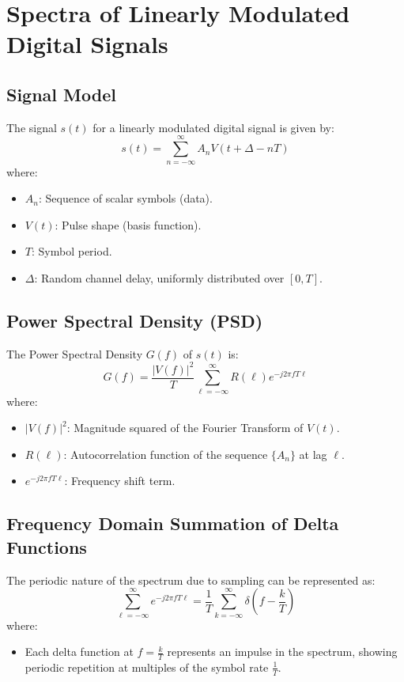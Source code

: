 \documentclass[10pt]{article}
\begin{document}
\section{Spectra of Linearly Modulated Digital Signals}

\subsection{Signal Model}
The signal \( s(t) \) for a linearly modulated digital signal is given by:
\[
s(t) = \sum_{n=-\infty}^{\infty} A_n V(t + \Delta - nT)
\]
where:
\begin{itemize}
    \item \( A_n \): Sequence of scalar symbols (data).
    \item \( V(t) \): Pulse shape (basis function).
    \item \( T \): Symbol period.
    \item \( \Delta \): Random channel delay, uniformly distributed over \( [0, T] \).
\end{itemize}

\subsection{Power Spectral Density (PSD)}
The Power Spectral Density \( G(f) \) of \( s(t) \) is:
\[
G(f) = \frac{|V(f)|^2}{T} \sum_{\ell=-\infty}^{\infty} R(\ell) e^{-j 2 \pi f T \ell}
\]
where:
\begin{itemize}
    \item \( |V(f)|^2 \): Magnitude squared of the Fourier Transform of \( V(t) \).
    \item \( R(\ell) \): Autocorrelation function of the sequence \( \{A_n\} \) at lag \( \ell \).
    \item \( e^{-j 2 \pi f T \ell} \): Frequency shift term.
\end{itemize}

\subsection{Frequency Domain Summation of Delta Functions}
The periodic nature of the spectrum due to sampling can be represented as:
\[
\sum_{\ell=-\infty}^{\infty} e^{-j 2 \pi f T \ell} = \frac{1}{T} \sum_{k=-\infty}^{\infty} \delta \left(f - \frac{k}{T}\right)
\]
where:
\begin{itemize}
    \item Each delta function at \( f = \frac{k}{T} \) represents an impulse in the spectrum, showing periodic repetition at multiples of the symbol rate \( \frac{1}{T} \).
\end{itemize}
\end{document}
